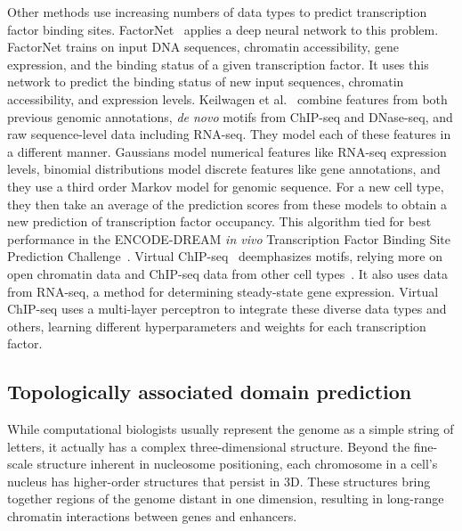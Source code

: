 \documentclass[5p]{elsarticle}
\newcommand{\rev}[1]{{\color{black}#1}}
\begin{document}
Other methods use increasing numbers of data types to predict transcription factor binding sites.
FactorNet~\cite{Quang2017FactorNet:Data} applies a deep neural network to this problem.
FactorNet trains on input DNA sequences, chromatin accessibility, gene expression, and the binding status of a given transcription factor.
It uses this network to predict the binding status of new input sequences, chromatin accessibility, and expression levels.
Keilwagen et al.~\cite{Keilwagen2017LearningBinding} combine features from both previous genomic annotations, \emph{de novo} motifs from ChIP-seq and DNase-seq, and raw sequence-level data including RNA-seq.
They model each of these features in a different manner.
Gaussians model numerical features like RNA-seq expression levels, binomial distributions model discrete features like gene annotations, and they use a third order Markov model for genomic sequence.
For a new cell type, they then take \rev{an} average of the prediction scores from these models to obtain a new prediction of transcription factor occupancy.
This algorithm tied for best performance in the ENCODE-DREAM \emph{in vivo} Transcription Factor Binding Site Prediction Challenge~\cite{2017ENCODE-DREAMSyn6131484}.
Virtual ChIP-seq~\cite{Karimzadeh2018VirtualTranscriptome} deemphasizes motifs, relying more on open chromatin data and ChIP-seq data from other cell types~\cite{Karimzadeh2018VirtualTranscriptome}.
It also uses data from RNA-seq, a method for determining steady-state gene expression.
Virtual ChIP-seq uses a multi-layer perceptron to integrate these diverse data types and others, learning different hyperparameters and weights for each transcription factor.

\subsection{Topologically associated domain prediction}

While computational biologists usually represent the ge\-no\-me as a simple string of letters, it actually has a complex three-dimensional structure.
Beyond the fine-scale structure inherent in nucleosome \rev{positioning,} each chromosome in a cell's nucleus has higher-order structures that persist in 3D. 
These structures bring together regions of the genome distant in one dimension, resulting in long-range chromatin interactions between genes and enhancers.
\end{document}
